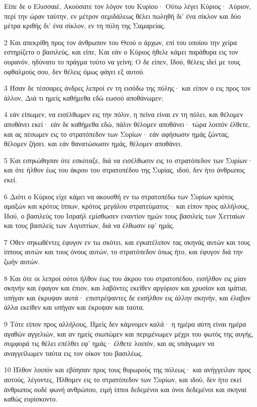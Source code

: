 \par Είπε δε ο Ελισσαιέ, Ακούσατε τον λόγον του Κυρίου· Ούτω λέγει Κύριος· Αύριον, περί την ώραν ταύτην, εν μέτρον σεμιδάλεως θέλει πωληθή δι' ένα σίκλον και δύο μέτρα κριθής δι' ένα σίκλον, εν τη πύλη της Σαμαρείας.
\par 2 Και απεκρίθη προς τον άνθρωπον του Θεού ο άρχων, επί του οποίου την χείρα εστηρίζετο ο βασιλεύς, και είπε, Και εάν ο Κύριος ήθελε κάμει παράθυρα εις τον ουρανόν, ηδύνατο το πράγμα τούτο να γείνη; Ο δε είπεν, Ιδού, θέλεις ιδεί με τους οφθαλμούς σου, δεν θέλεις όμως φάγει εξ αυτού.
\par 3 Ήσαν δε τέσσαρες άνδρες λεπροί εν τη εισόδω της πύλης· και είπον ο εις προς τον άλλον, Διά τι ημείς καθήμεθα εδώ εωσού αποθάνωμεν;
\par 4 εάν είπωμεν, να εισέλθωμεν εις την πόλιν, η πείνα είναι εν τη πόλει, και θέλομεν αποθάνει εκεί· εάν δε καθήμεθα εδώ, πάλιν θέλομεν αποθάνει· τώρα λοιπόν έλθετε, και ας πέσωμεν εις το στρατόπεδον των Συρίων· εάν αφήσωσιν ημάς ζώντας, θέλομεν ζήσει. και εάν θανατώσωσιν ημάς, θέλομεν αποθάνει.
\par 5 Και εσηκώθησαν ότε εσκόταζε, διά να εισέλθωσιν εις το στρατόπεδον των Συρίων· και ότε ήλθον έως του άκρου του στρατοπέδου της Συρίας, ιδού, δεν ήτο άνθρωπος εκεί.
\par 6 Διότι ο Κύριος είχε κάμει να ακουσθή εν τω στρατοπέδω των Συρίων κρότος αμαξών και κρότος ίππων, κρότος μεγάλου στρατεύματος· και είπον προς αλλήλους, Ιδού, ο βασιλεύς του Ισραήλ εμίσθωσεν εναντίον ημών τους βασιλείς των Χετταίων και τους βασιλείς των Αιγυπτίων, διά να έλθωσιν εφ' ημάς.
\par 7 Όθεν σηκωθέντες έφυγον εν τω σκότει, και εγκατέλιπον τας σκηνάς αυτών και τους ίππους αυτών και τους όνους αυτών, το στρατόπεδον όπως ήτο, και έφυγον διά την ζωήν αυτών.
\par 8 Και ότε οι λεπροί ούτοι ήλθον έως του άκρου του στρατοπέδου, εισήλθον εις μίαν σκηνήν και έφαγον και έπιον, και λαβόντες εκείθεν αργύριον και χρυσίον και ιμάτια, υπήγαν και έκρυψαν αυτά· επιστρέψαντες δε εισήλθον εις άλλην σκηνήν, και έλαβον άλλα εκείθεν και υπήγαν και έκρυψαν και ταύτα.
\par 9 Τότε είπον προς αλλήλους, Ημείς δεν κάμνομεν καλά· η ημέρα αύτη είναι ημέρα αγαθών αγγελιών, και αν ημείς σιωπώμεν και περιμένωμεν μέχρι του φωτός της αυγής, συμφορά τις θέλει επέλθει εφ' ημάς· έλθετε λοιπόν, και ας υπάγωμεν να αναγγείλωμεν ταύτα εις τον οίκον του βασιλέως.
\par 10 Ήλθον λοιπόν και εβόησαν προς τους θυρωρούς της πόλεως· και ανήγγειλαν προς αυτούς, λέγοντες, Ήλθομεν εις το στρατόπεδον των Συρίων, και ιδού, δεν ήτο εκεί άνθρωπος ουδέ φωνή ανθρώπου, ειμή ίπποι δεδεμένοι και όνοι δεδεμένοι και σκηναί καθώς ευρίσκοντο.
